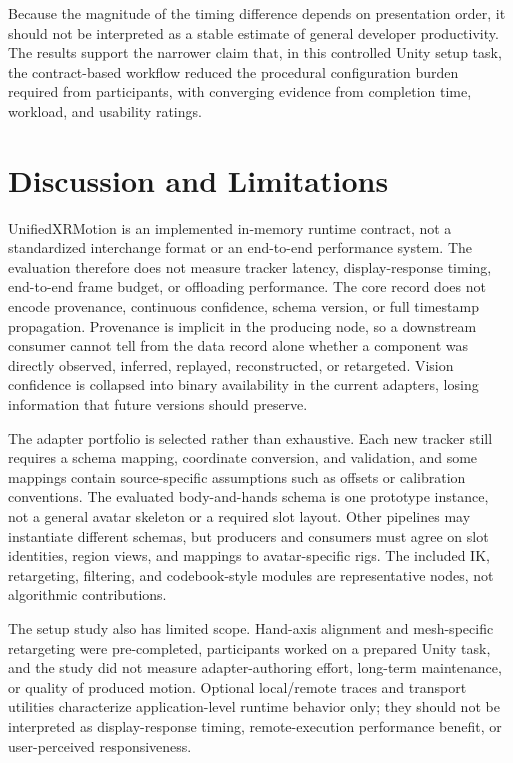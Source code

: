 \documentclass[runningheads]{llncs}
\begin{document}
Because the magnitude of the timing difference depends on presentation order, it should not be interpreted as a stable estimate of general developer productivity. The results support the narrower claim that, in this controlled Unity setup task, the contract-based workflow reduced the procedural configuration burden required from participants, with converging evidence from completion time, workload, and usability ratings.

\section{Discussion and Limitations}\label{sec:discussion-limitations}
UnifiedXRMotion is an implemented in-memory runtime contract, not a standardized interchange format or an end-to-end performance system. The evaluation therefore does not measure tracker latency, display-response timing, end-to-end frame budget, or offloading performance. The core record does not encode provenance, continuous confidence, schema version, or full timestamp propagation. Provenance is implicit in the producing node, so a downstream consumer cannot tell from the data record alone whether a component was directly observed, inferred, replayed, reconstructed, or retargeted. Vision confidence is collapsed into binary availability in the current adapters, losing information that future versions should preserve.

The adapter portfolio is selected rather than exhaustive. Each new tracker still requires a schema mapping, coordinate conversion, and validation, and some mappings contain source-specific assumptions such as offsets or calibration conventions. The evaluated body-and-hands schema is one prototype instance, not a general avatar skeleton or a required slot layout. Other pipelines may instantiate different schemas, but producers and consumers must agree on slot identities, region views, and mappings to avatar-specific rigs. The included IK, retargeting, filtering, and codebook-style modules are representative nodes, not algorithmic contributions.

The setup study also has limited scope. Hand-axis alignment and mesh-specific retargeting were pre-completed, participants worked on a prepared Unity task, and the study did not measure adapter-authoring effort, long-term maintenance, or quality of produced motion. Optional local/remote traces and transport utilities characterize application-level runtime behavior only; they should not be interpreted as display-response timing, remote-execution performance benefit, or user-perceived responsiveness.
\end{document}
